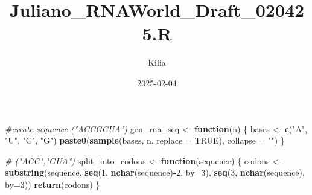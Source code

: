 \documentclass[
]{article}
\title{Juliano\_RNAWorld\_Draft\_020425.R}
\author{Kilia}
\date{2025-02-04}
\newenvironment{Shaded}{\begin{snugshade}}{\end{snugshade}}
\newcommand{\AttributeTok}[1]{\textcolor[rgb]{0.13,0.29,0.53}{#1}}
\newcommand{\CommentTok}[1]{\textcolor[rgb]{0.56,0.35,0.01}{\textit{#1}}}
\newcommand{\ConstantTok}[1]{\textcolor[rgb]{0.56,0.35,0.01}{#1}}
\newcommand{\ControlFlowTok}[1]{\textcolor[rgb]{0.13,0.29,0.53}{\textbf{#1}}}
\newcommand{\DecValTok}[1]{\textcolor[rgb]{0.00,0.00,0.81}{#1}}
\newcommand{\FunctionTok}[1]{\textcolor[rgb]{0.13,0.29,0.53}{\textbf{#1}}}
\newcommand{\NormalTok}[1]{#1}
\newcommand{\OtherTok}[1]{\textcolor[rgb]{0.56,0.35,0.01}{#1}}
\newcommand{\SpecialCharTok}[1]{\textcolor[rgb]{0.81,0.36,0.00}{\textbf{#1}}}
\newcommand{\StringTok}[1]{\textcolor[rgb]{0.31,0.60,0.02}{#1}}
\begin{document}
\maketitle

\begin{Shaded}
\begin{Highlighting}[]
\CommentTok{\#create sequence ("ACCGCUA")}
\NormalTok{gen\_rna\_seq }\OtherTok{\textless{}{-}} \ControlFlowTok{function}\NormalTok{(n) \{}
\NormalTok{  bases }\OtherTok{\textless{}{-}} \FunctionTok{c}\NormalTok{(}\StringTok{"A"}\NormalTok{, }\StringTok{"U"}\NormalTok{, }\StringTok{"C"}\NormalTok{, }\StringTok{"G"}\NormalTok{)}
  \FunctionTok{paste0}\NormalTok{(}\FunctionTok{sample}\NormalTok{(bases, n, }\AttributeTok{replace =} \ConstantTok{TRUE}\NormalTok{), }\AttributeTok{collapse =} \StringTok{""}\NormalTok{)}
\NormalTok{\}}

\CommentTok{\# ("ACC","GUA")}
\NormalTok{split\_into\_codons }\OtherTok{\textless{}{-}} \ControlFlowTok{function}\NormalTok{(sequence) \{}
\NormalTok{  codons }\OtherTok{\textless{}{-}} \FunctionTok{substring}\NormalTok{(sequence, }\FunctionTok{seq}\NormalTok{(}\DecValTok{1}\NormalTok{, }\FunctionTok{nchar}\NormalTok{(sequence)}\SpecialCharTok{{-}}\DecValTok{2}\NormalTok{, }\AttributeTok{by=}\DecValTok{3}\NormalTok{), }\FunctionTok{seq}\NormalTok{(}\DecValTok{3}\NormalTok{, }\FunctionTok{nchar}\NormalTok{(sequence), }\AttributeTok{by=}\DecValTok{3}\NormalTok{))}
  \FunctionTok{return}\NormalTok{(codons)}
\NormalTok{\}}


\end{Highlighting}
\end{Shaded}
\end{document}
